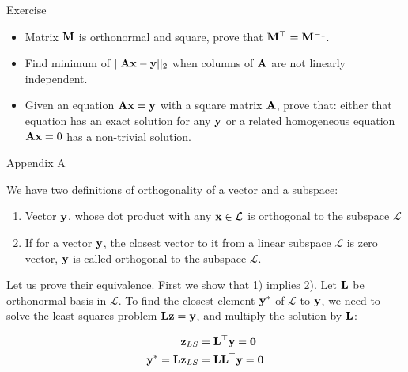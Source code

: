 \documentclass{beamer}
\begin{document}
\begin{frame}{Exercise}
	\begin{flushleft}
		
		\begin{itemize}
			\item Matrix $\mathbf{M}$ is orthonormal and square, prove that $\mathbf{M}^\top = \mathbf{M}^{-1}$.
			
			\item Find minimum of $||\mathbf{A}\mathbf{x} - \mathbf{y}||_2$ when columns of $\mathbf{A}$ are not linearly independent.
			
			\item Given an equation $\mathbf{A}\mathbf{x} = \mathbf{y}$ with a square matrix $\mathbf{A}$, prove that: either that equation has an exact solution for any $\mathbf{y}$ or a related homogeneous equation $\mathbf{A}\mathbf{x} = 0$ has a non-trivial solution.
		\end{itemize}
		
		
		
	\end{flushleft}
\end{frame}




\myqrframe



\begin{frame}{Appendix A}
	\begin{flushleft}
		
		We have two definitions of orthogonality of a vector and a subspace:
		
		\begin{enumerate}
			\item Vector $\mathbf{y}$, whose dot product with any $\mathbf{x} \in \mathcal{L}$ is orthogonal to the subspace $\mathcal{L}$
			
			\item If for a vector $\mathbf{y}$, the closest vector to it from a linear subspace $\mathcal{L}$ is zero vector, $\mathbf{y}$ is called orthogonal to the subspace $\mathcal{L}$.
		\end{enumerate}
		
	Let us prove their equivalence. First we show that 1) implies 2). Let $\mathbf{L}$ be orthonormal basis in $\mathcal{L}$. To find the closest element $\mathbf{y}^*$ of $\mathcal{L}$ to $\mathbf{y}$, we need to solve the least squares problem $\mathbf{L}\mathbf{z} = \mathbf{y}$, and multiply the solution by $\mathbf{L}$:
	
	\begin{align}
		\mathbf{z}_{LS} &= \mathbf{L}^\top \mathbf{y} = \mathbf{0} \\
    	\mathbf{y}^* = \mathbf{L}\mathbf{z}_{LS} &= \mathbf{L}\mathbf{L}^\top \mathbf{y} = \mathbf{0}
	\end{align}		
		
	\end{flushleft}
\end{frame}
\end{document}
